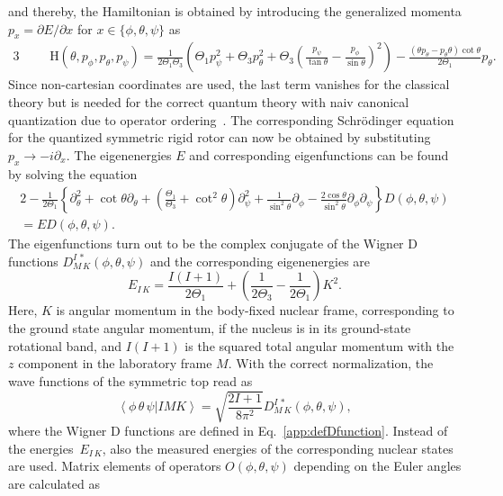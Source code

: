 and thereby, the Hamiltonian is obtained by introducing the generalized momenta $p_x=\partial E / \partial x$ for $x\in \{ \phi,\theta,\psi\}$ as
\begin{alignat}{3}
&&&\mathrm{H}(\theta,p_\phi,p_\theta,p_\psi)=\frac{1}{2\Theta_1 \Theta_3}\left( \Theta_1 p^2_\psi + \Theta_3 p^2_\theta + \Theta_3 \left( \frac{p_\psi}{\tan\theta} - \frac{p_\phi}{\sin\theta} \right)^2 \right)
-\frac{(\theta p_\theta - p_\theta \theta)\cot\theta }{2\Theta_1}p_\theta.
\end{alignat}
Since non-cartesian coordinates are used, the last term vanishes for the classical theory but is needed for the correct quantum theory with naiv canonical quantization due to operator ordering~\cite{podolsky1928}.
The corresponding Schrödinger equation for the quantized symmetric rigid rotor can now be obtained by substituting $p_x \rightarrow -i\partial_x$. The eigenenergies $E$ and corresponding eigenfunctions can be found by solving the equation~\cite{edmonds1960}
\begin{alignat}{2}
-\frac{1}{2\Theta_1}\left\{ \partial^2_\theta + \cot\theta \partial_\theta+\left(\frac{\Theta_1}{\Theta_3}+\cot^2\theta\right)\partial_\psi^2+\frac{1}{\sin^2\theta}\partial_\phi-\frac{2\cos\theta}{\sin^2\theta}\partial_\phi\partial_\psi\right\} D(\phi,\theta,\psi)\\[4pt] = E D(\phi,\theta,\psi).
\end{alignat}
The eigenfunctions turn out to be the complex conjugate of the Wigner D functions $D^{I\,*}_{M\,K}(\phi,\theta,\psi)$ and the corresponding eigenenergies are~\cite{kronig1927}
\begin{equation}
E_{I\,K}=\frac{I(I+1)}{2\Theta_1}+ \left(\frac{1}{2\Theta_3}-\frac{1}{2\Theta_1}\right)K^2.
\label{eq:rig_rotorEn}
\end{equation}
Here, $K$ is angular momentum in the body-fixed nuclear frame, corresponding to the ground state angular momentum, if the nucleus is in its ground-state rotational band, and $I(I+1)$ is the squared total angular momentum with the $z$ component in the laboratory frame $M$. With the correct normalization, the wave functions of the symmetric top read as
\begin{equation}
\label{app:rigidRot_state}
\left<\phi\,\theta\,\psi|IMK\right> = \sqrt{\frac{2I+1}{8\pi^2}}D^{I\,*}_{M\,K}(\phi,\theta,\psi),
\end{equation}
where the Wigner D functions are defined in Eq.~\eqref{app:defDfunction}. 
Instead of the energies~$E_{I\,K}$, also the measured energies of the corresponding nuclear states~\cite{ENSDF} are used. Matrix elements of operators $O(\phi,\theta,\psi)$ depending on the Euler angles are calculated as
